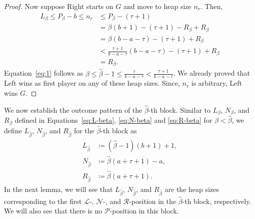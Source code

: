 \documentclass[oneside,reqno]{amsart}
\newcommand{\lp}{\mathscr{L}}
\newcommand{\rp}{\mathscr{R}}
\newcommand{\np}{\mathscr{N}}
\newcommand{\pp}{\mathscr{P}}
\newcommand{\hbeta}{\widehat\beta}
\begin{document}
\begin{proof}
    Now suppose Right starts on $G$ and move to heap size $n_r$. Then, \begin{align}
        L_\beta\le P_\beta-b\le n_r&\le P_\beta-(\tau+1)\nonumber\\
        &=\beta(b+1)-(\tau+1)-R_\beta+R_\beta\nonumber\\
        &=\beta(b-a-\tau)-(\tau+1)+R_\beta\nonumber\\
        &<\frac{\tau+1}{b-a-\tau}(b-a-\tau)-(\tau+1)+R_\beta\label{eq:1}\\
        &=R_\beta\nonumber.
    \end{align}
    Equation~\eqref{eq:1} follows as $\beta\le \hbeta-1\le \frac{\tau}{b-a-\tau}<\frac{\tau+1}{b-a-\tau}$. We already proved that Left wins as first player on any of these heap sizes. Since, $n_r$ is arbitrary, Left wins $G$. 
\end{proof}

We now establish the outcome pattern of the $\widehat \beta$-th block. Similar to $L_\beta$, $N_\beta$, and $R_\beta$ defined in Equations~\eqref{eq:L-beta}, \eqref{eq:N-beta} and \eqref{eq:R-beta} for $\beta<\hbeta$, we define $L_{\hbeta}$, $N_{\hbeta}$, and $R_{\hbeta}$ for the $\hbeta$-th block as \begin{align}
    L_{\hbeta}&\coloneq(\hbeta-1)(b+1)+1,\\
    N_{\hbeta}&\coloneq\hbeta(a+\tau+1)-a,\\
    R_{\hbeta}&\coloneq\hbeta(a+\tau+1).
\end{align} In the next lemma, we will see that $L_{\hbeta}$, $N_{\hbeta}$, and $R_{\hbeta}$ are the heap sizes corresponding to the first $\lp$-, $\np$-, and $\rp$-position in the $\hbeta$-th block, respectively. We will also see that there is no $\pp$-position in this block.

\end{document}
